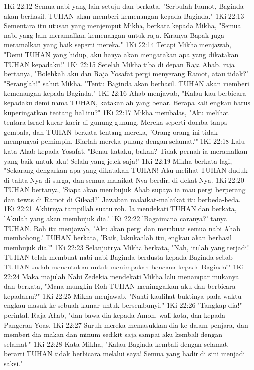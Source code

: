 1Ki 22:12  Semua nabi yang lain setuju dan berkata, "Serbulah Ramot, Baginda akan berhasil. TUHAN akan memberi kemenangan kepada Baginda."
1Ki 22:13  Sementara itu utusan yang menjemput Mikha, berkata kepada Mikha, "Semua nabi yang lain meramalkan kemenangan untuk raja. Kiranya Bapak juga meramalkan yang baik seperti mereka."
1Ki 22:14  Tetapi Mikha menjawab, "Demi TUHAN yang hidup, aku hanya akan mengatakan apa yang dikatakan TUHAN kepadaku!"
1Ki 22:15  Setelah Mikha tiba di depan Raja Ahab, raja bertanya, "Bolehkah aku dan Raja Yosafat pergi menyerang Ramot, atau tidak?" "Seranglah!" sahut Mikha. "Tentu Baginda akan berhasil. TUHAN akan memberi kemenangan kepada Baginda."
1Ki 22:16  Ahab menjawab, "Kalau kau berbicara kepadaku demi nama TUHAN, katakanlah yang benar. Berapa kali engkau harus kuperingatkan tentang hal itu?"
1Ki 22:17  Mikha membalas, "Aku melihat tentara Israel kucar-kacir di gunung-gunung. Mereka seperti domba tanpa gembala, dan TUHAN berkata tentang mereka, 'Orang-orang ini tidak mempunyai pemimpin. Biarlah mereka pulang dengan selamat.'"
1Ki 22:18  Lalu kata Ahab kepada Yosafat, "Benar kataku, bukan? Tidak pernah ia meramalkan yang baik untuk aku! Selalu yang jelek saja!"
1Ki 22:19  Mikha berkata lagi, "Sekarang dengarkan apa yang dikatakan TUHAN! Aku melihat TUHAN duduk di tahta-Nya di surga, dan semua malaikat-Nya berdiri di dekat-Nya.
1Ki 22:20  TUHAN bertanya, 'Siapa akan membujuk Ahab supaya ia mau pergi berperang dan tewas di Ramot di Gilead?' Jawaban malaikat-malaikat itu berbeda-beda.
1Ki 22:21  Akhirnya tampillah suatu roh. Ia mendekati TUHAN dan berkata, 'Akulah yang akan membujuk dia.'
1Ki 22:22  'Bagaimana caranya?' tanya TUHAN. Roh itu menjawab, 'Aku akan pergi dan membuat semua nabi Ahab membohong.' TUHAN berkata, 'Baik, lakukanlah itu, engkau akan berhasil membujuk dia.'"
1Ki 22:23  Selanjutnya Mikha berkata, "Nah, itulah yang terjadi! TUHAN telah membuat nabi-nabi Baginda berdusta kepada Baginda sebab TUHAN sudah menentukan untuk menimpakan bencana kepada Baginda!"
1Ki 22:24  Maka majulah Nabi Zedekia mendekati Mikha lalu menampar mukanya dan berkata, "Mana mungkin Roh TUHAN meninggalkan aku dan berbicara kepadamu?"
1Ki 22:25  Mikha menjawab, "Nanti kaulihat buktinya pada waktu engkau masuk ke sebuah kamar untuk bersembunyi."
1Ki 22:26  "Tangkap dia!" perintah Raja Ahab, "dan bawa dia kepada Amon, wali kota, dan kepada Pangeran Yoas.
1Ki 22:27  Suruh mereka memasukkan dia ke dalam penjara, dan memberi dia makan dan minum sedikit saja sampai aku kembali dengan selamat."
1Ki 22:28  Kata Mikha, "Kalau Baginda kembali dengan selamat, berarti TUHAN tidak berbicara melalui saya! Semua yang hadir di sini menjadi saksi."
